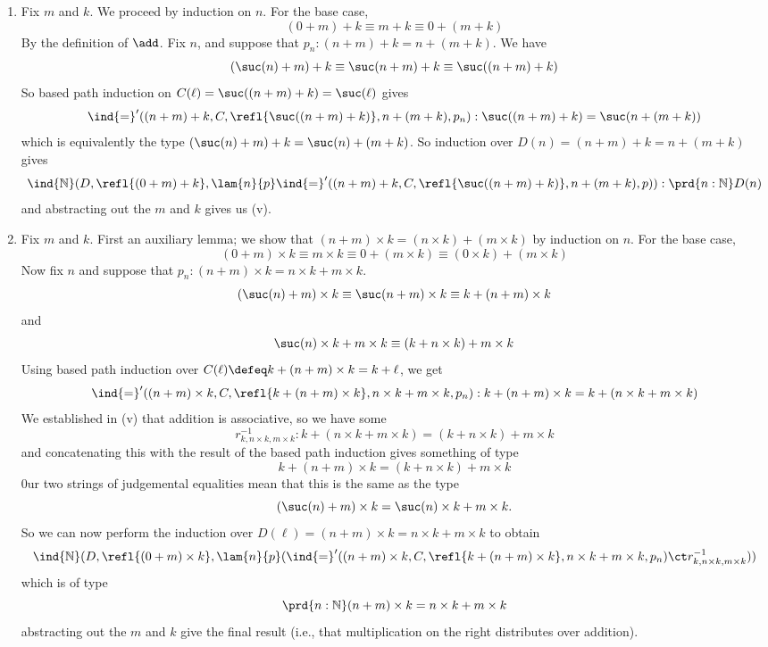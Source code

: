 \begin{enumerate}
\item Fix $m$ and $k$.  We proceed by induction on $n$.  For the base case,
\[
  (0 + m) + k \equiv m + k \equiv 0 + (m + k)
\]
By the definition of $\add$.  Fix $n$, and suppose that $p_{n} : (n + m) + k =
n + (m + k)$.  We have
\[
  (\suc(n) + m) + k
  \equiv \suc(n + m) + k
  \equiv \suc((n+m)+k)
\]
So based path induction on $C(\ell) = \suc((n+m)+k) = \suc(\ell)$ gives
\[
  \ind{=}'((n+m)+k, C, \refl{\suc((n+m)+k)}, n+(m+k), p_{n})
  :
  \suc((n+m)+k) = \suc(n+(m+k))
\]
which is equivalently the type $(\suc(n)+m)+k = \suc(n) + (m + k)$.  So
induction over $D(n) = (n+m)+k = n+(m+k)$ gives
\[
  \ind{\mathbb{N}}(D, \refl{(0+m)+k}, 
  \lam{n}{p}
  \ind{=}'((n+m)+k, C, \refl{\suc((n+m)+k)}, n+(m+k), p)
  )
  :
  \prd{n:\mathbb{N}}D(n)
\]
and abstracting out the $m$ and $k$ gives us (v).

\item Fix $m$ and $k$.  First an auxiliary lemma; we show that $(n+m) \times k
= (n \times k) + (m \times k)$ by induction on $n$.  For the base case,
\[
  (0+m) \times k \equiv m \times k \equiv 0 + (m \times k) \equiv (0 \times k)
  + (m \times k)
\]
Now fix $n$ and suppose that $p_{n} : (n+m) \times k = n \times k + m \times
k$.
\[
  (\suc(n) + m) \times k
  \equiv \suc(n + m) \times k
  \equiv k + (n + m) \times k
\]
and
\[
  \suc(n) \times k + m \times k
  \equiv 
  (k + n \times k) + m \times k
\]
Using based path induction over $C(\ell) \defeq k + (n + m) \times k = k +
\ell$, we get
\[
\ind{=}'((n+m)\times k, C, \refl{k+(n+m)\times k}, n \times k + m \times
k, p_{n})
  :
  k + (n+m) \times k = k + (n \times k + m \times k)
\]
We established in (v) that addition is associative, so we have some
\[
  r_{k, n \times k, m \times k}^{-1} 
  : k + (n \times k + m \times k) = (k + n
  \times k) + m \times k
\]
and concatenating this with the result of the based path induction gives
something of type
\[
  k + (n + m) \times k = (k + n \times k) + m \times k
\]
0ur two strings of judgemental equalities mean that this is the same as the
type
\[
  (\suc(n) + m) \times k = \suc(n) \times k + m \times k.
\]
So we can now perform the induction over $D(\ell) = (n + m) \times k = n \times
k + m \times k$ to obtain
\[
  \ind{\mathbb{N}}(D, \refl{(0+m) \times k}, 
  \lam{n}{p}(
\ind{=}'((n+m)\times k, C, \refl{k+(n+m)\times k}, n \times k + m \times
k, p_{n})
\ct
  r_{k, n \times k, m \times k}^{-1})
  )
\]
which is of type
\[
  \prd{n : \mathbb{N}} (n+m) \times k = n \times k + m \times k
\]
abstracting out the $m$ and $k$ give the final result (i.e., that
multiplication on the right distributes over addition).


\end{enumerate}
